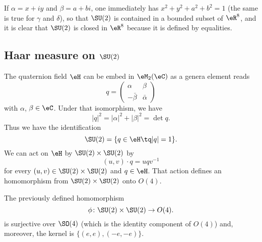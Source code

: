 If $\alpha=x+iy$ and $\beta=a+bi$, one immediately has  $x^2+y^2+a^2+b^2=1$ (the same is true for $\gamma$ and $\delta$), so that $\SU(2)$ is contained in a bounded subset of $\eR^8$, and it is clear that $\SU(2)$ is closed in $\eR^8$ because it is defined by equalities.

					\subsection{Haar measure on \texorpdfstring{$\SU(2)$}{SU2}}

The quaternion field $\eH$ can be embed in $\eM_2(\eC)$ as a genera element reads
\begin{equation}
	q=
\begin{pmatrix}
  \alpha	&	\beta	\\ 
  -\bar\beta	&	\bar\alpha	
\end{pmatrix}
\end{equation}
with $\alpha$, $\beta\in\eC$. Under that isomorphism, we have
\[ 
	| q |^2=| \alpha |^2+| \beta |^2=\det q.
\]
Thus we have the identification
\begin{equation}
	\SU(2)=\{ q\in\eH\tq | q |=1 \}.
\end{equation}
We can act on $\eH$ by $\SU(2)\times \SU(2)$ by
\begin{equation}
	(u,v)\cdot q=uqv^{-1}
\end{equation}
for every $(u,v)\in \SU(2)\times\SU(2)$ and $q\in\eH$. That action defines an homomorphism from $\SU(2)\times\SU(2)$ onto $O(4)$.

\begin{proposition}
The previously defined homomorphism
\[ 
	\phi\colon \SU(2)\times\SU(2)\to O(4).
\]
is surjective over $\SO(4)$ (which is the identity component of $O(4)$) and, moreover, the kernel is $\big\{  (e,e),(-e,-e) \big\}$.
\end{proposition}

